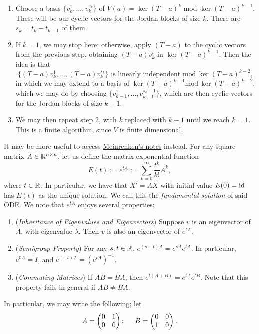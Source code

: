 \begin{enumerate}[label=(\roman*)]
    \item Choose a basis $\{v_k^1, \dots, v_k^{s_k}\}$ of $V(a) = \ker (T - a)^k$ mod $\ker (T - a)^{k-1}$. These will be our cyclic vectors for the Jordan blocks of size $k$. There are $s_k = t_k - t_{k-1}$ of them.
    \item If $k = 1$, we may stop here; otherwise, apply $(T - a)$ to the cyclic vectors from the previous step, obtaining $(T - a)v_k^i$ in $\ker (T - a)^{k-1}$. Then the idea is that
    \[ \{(T - a) v_k^1 , \dots, (T - a) v_k^{s_k}\} \text{ is linearly independent } \mathrm{mod} \, \ker (T - a)^{k-2}, \]
    in which we may extend to a basis of $\ker (T - a)^{k-1} \mathrm{mod} \, \ker (T - a)^{k-2}$, which we may do by choosing $\{v_{k-1}^1, \dots, v_{k-1}^{s_k-1}\}$, which are then cyclic vectors for the Jordan blocks of size $k-1$.
    \item We may then repeat step $2$, with $k$ replaced with $k-1$ until we reach $k = 1$. This is a finite algorithm, since $V$ is finite dimensional.
\end{enumerate}
It may be more useful to access \href{https://q.utoronto.ca/courses/339533/pages/lecture-notes?module_item_id=5307111}{Meinrenken's notes} instead.
\newpage
\noindent For any square matrix $A \in \mathbb R^{n \times n}$, let us define the matrix exponential function
\[ E(t) := e^{tA} := \sum_{k=0}^\infty \frac{t^k}{k!} A^k, \]
where $t \in \mathbb R$. In particular, we have that $X' = AX$ with initial value $E(0) = \mathrm{id}$ has $E(t)$ as the unique solution. We call this the \textit{fundamental solution} of said ODE. We note that $e^{tA}$ enjoys several properties;
\begin{enumerate}[label=(\roman*)]
    \item (\textit{Inheritance of Eigenvalues and Eigenvectors}) Suppose $v$ is an eigenvector of $A$, with eigenvalue $\lambda$. Then $v$ is also an eigenvector of $e^{tA}$.
    \item (\textit{Semigroup Property}) For any $s, t \in \mathbb R$, $e^{(s+t)A} = e^{sA} e^{tA}$. In particular, $e^{0A} = I$, and $e^{(-t)A} = (e^{tA})^{-1}$.
    \item (\textit{Commuting Matrices}) If $AB = BA$, then $e^{t(A+B)} = e^{tA} e^{tB}$. Note that this property fails in general if $AB \neq BA$.
\end{enumerate}
In particular, we may write the following; let
\[ A = \begin{pmatrix} 0 & 1 \\ 0 & 0 \end{pmatrix}; \hspace{0.2in} B = \begin{pmatrix} 0 & 0 \\ 1 & 0 \end{pmatrix}. \]
